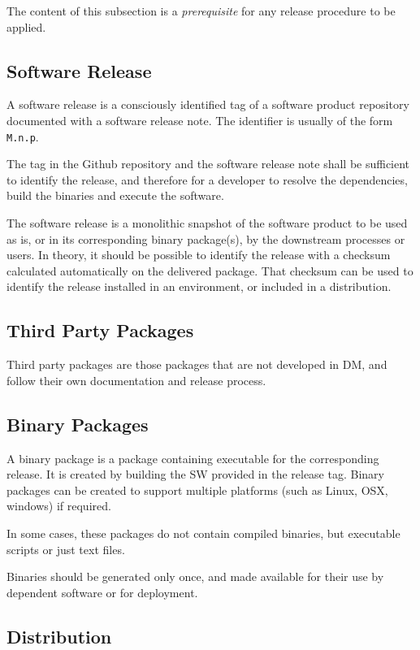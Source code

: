 The content of this subsection is a \textit{prerequisite} for any release procedure to be applied.


\subsection{Software Release} \label{sec:defrelease}

A software release is a consciously identified tag of a software product repository documented with a software release note.
The identifier is usually of the form \texttt{M.n.p}.

The tag in the Github repository and the software release note shall be sufficient to identify the release, and therefore for a developer
to resolve the dependencies, build the binaries and execute the software.

The software release is a monolithic snapshot of the software product to be used as is, or in its corresponding binary package(s), by the downstream processes or users.
In theory, it should be possible to identify the release with a checksum calculated automatically on the delivered package.
That checksum can be used to identify the release installed in an environment, or included in a distribution.


\subsection{Third Party Packages}

Third party packages are those packages that are not developed in \gls{DM}, and follow their own documentation and release process.


\subsection{Binary Packages} \label{sec:swbpkg}

A binary package is a package containing executable for the corresponding release.
It is created by building the \gls{SW} provided in the release tag.
Binary packages can be created to support multiple platforms (such as Linux, \gls{OSX}, windows) if required.

In some cases, these packages do not contain compiled binaries, but executable scripts or just text files.

Binaries should be generated only once, and made available for their use by dependent software or for deployment.


\subsection{Distribution} \label{sec:distribution}


